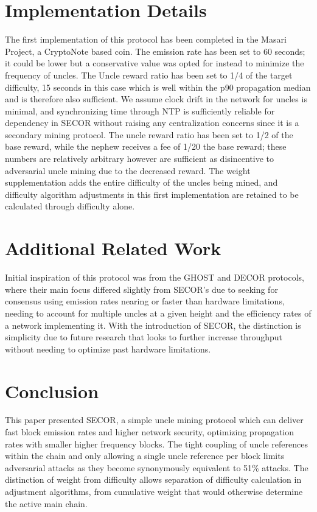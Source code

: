 \documentclass{article}
\begin{document}
\section{Implementation Details}
The first implementation of this protocol has been completed in the Masari Project, a CryptoNote based coin. The emission rate has been set to 60 seconds; it could be lower but a conservative value was opted for instead to minimize the frequency of uncles. The Uncle reward ratio has been set to 1/4 of the target difficulty, 15 seconds in this case which is well within the p90 propagation median and is therefore also sufficient. We assume clock drift in the network for uncles is minimal, and synchronizing time through NTP is sufficiently reliable for dependency in SECOR without raising any centralization concerns since it is a secondary mining protocol. The uncle reward ratio has been set to 1/2 of the base reward, while the nephew receives a fee of 1/20 the base reward; these numbers are relatively arbitrary however are sufficient as disincentive to adversarial uncle mining due to the decreased reward. The weight supplementation adds the entire difficulty of the uncles being mined, and difficulty algorithm adjustments in this first implementation are retained to be calculated through difficulty alone.

\section{Additional Related Work}
Initial inspiration of this protocol was from the GHOST and DECOR protocols, where their main focus differed slightly from SECOR's due to seeking for consensus using emission rates nearing or faster than hardware limitations, needing to account for multiple uncles at a given height and the efficiency rates of a network implementing it\cite{sompolinsky}\cite{sdlerner}\cite{ethereum}. With the introduction of SECOR, the distinction is simplicity due to future research that looks to further increase throughput without needing to optimize past hardware limitations.

\section{Conclusion}
This paper presented SECOR, a simple uncle mining protocol which can deliver fast block emission rates and higher network security, optimizing propagation rates with smaller higher frequency blocks. The tight coupling of uncle references within the chain and only allowing a single uncle reference per block limits adversarial attacks as they become synonymously equivalent to 51\% attacks. The distinction of weight from difficulty allows separation of difficulty calculation in adjustment algorithms, from cumulative weight that would otherwise determine the active main chain.
\end{document}

